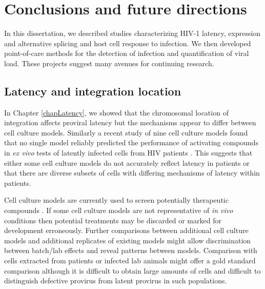 \documentclass[../sherrill-Mix_thesis.tex]{subfiles}
\begin{document}
\chapter{Conclusions and future directions}
\graphicspath{{im/}{conclusion/im/}}

In this dissertation, we described studies characterizing HIV-1 latency, expression and alternative splicing and host cell response to infection. We then developed point-of-care methods for the detection of infection and quantification of viral load. These projects suggest many avenues for continuing research.


\section{Latency and integration location}

	In Chapter \ref{chapLatency}, we showed that the chromosomal location of integration affects proviral latency but the mechanisms appear to differ between cell culture models. Similarly a recent study of nine cell culture models found that no single model reliably predicted the performance of activating compounds in \textit{ex vivo} tests of latently infected cells from HIV patients \citep{Spina2013}. This suggests that either some cell culture models do not accurately reflect latency in patients or that there are diverse subsets of cells with differing mechanisms of latency within patients. 

	Cell culture models are currently used to screen potentially therapeutic compounds \citep{Xing2011,Spina2013}. If some cell culture models are not representative of \textit{in vivo} conditions then potential treatments may be discarded or marked for development erroneously. Further comparisons between additional cell culture models and additional replicates of existing models might allow discrimination between batch/lab effects and reveal patterns between models. Comparison with cells extracted from patients or infected lab animals might offer a gold standard comparison although it is difficult to obtain large amounts of cells and difficult to distinguish defective provirus from latent provirus in such populations. %
\end{document}
